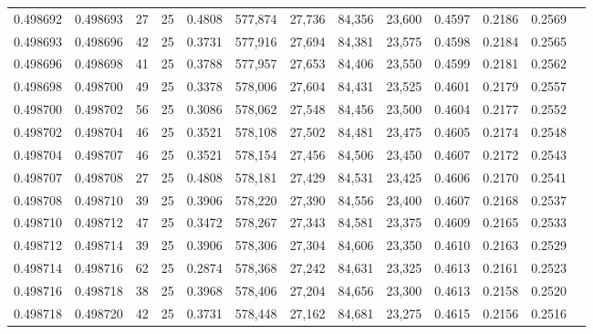 \begin{tabular}{rrrrrrrrrrrrr}
0.498692 & 0.498693 &    27 &  25 &                                     0.4808 & 577,874 &  27,736 &  84,356 &  23,600 & 0.4597 & 0.2186 & 0.2569 \\
0.498693 & 0.498696 &    42 &  25 &                                     0.3731 & 577,916 &  27,694 &  84,381 &  23,575 & 0.4598 & 0.2184 & 0.2565 \\
0.498696 & 0.498698 &    41 &  25 &                                     0.3788 & 577,957 &  27,653 &  84,406 &  23,550 & 0.4599 & 0.2181 & 0.2562 \\
0.498698 & 0.498700 &    49 &  25 &                                     0.3378 & 578,006 &  27,604 &  84,431 &  23,525 & 0.4601 & 0.2179 & 0.2557 \\
0.498700 & 0.498702 &    56 &  25 &                                     0.3086 & 578,062 &  27,548 &  84,456 &  23,500 & 0.4604 & 0.2177 & 0.2552 \\
0.498702 & 0.498704 &    46 &  25 &                                     0.3521 & 578,108 &  27,502 &  84,481 &  23,475 & 0.4605 & 0.2174 & 0.2548 \\
0.498704 & 0.498707 &    46 &  25 &                                     0.3521 & 578,154 &  27,456 &  84,506 &  23,450 & 0.4607 & 0.2172 & 0.2543 \\
0.498707 & 0.498708 &    27 &  25 &                                     0.4808 & 578,181 &  27,429 &  84,531 &  23,425 & 0.4606 & 0.2170 & 0.2541 \\
0.498708 & 0.498710 &    39 &  25 &                                     0.3906 & 578,220 &  27,390 &  84,556 &  23,400 & 0.4607 & 0.2168 & 0.2537 \\
0.498710 & 0.498712 &    47 &  25 &                                     0.3472 & 578,267 &  27,343 &  84,581 &  23,375 & 0.4609 & 0.2165 & 0.2533 \\
0.498712 & 0.498714 &    39 &  25 &                                     0.3906 & 578,306 &  27,304 &  84,606 &  23,350 & 0.4610 & 0.2163 & 0.2529 \\
0.498714 & 0.498716 &    62 &  25 &                                     0.2874 & 578,368 &  27,242 &  84,631 &  23,325 & 0.4613 & 0.2161 & 0.2523 \\
0.498716 & 0.498718 &    38 &  25 &                                     0.3968 & 578,406 &  27,204 &  84,656 &  23,300 & 0.4613 & 0.2158 & 0.2520 \\
0.498718 & 0.498720 &    42 &  25 &                                     0.3731 & 578,448 &  27,162 &  84,681 &  23,275 & 0.4615 & 0.2156 & 0.2516 \\

\end{tabular}
